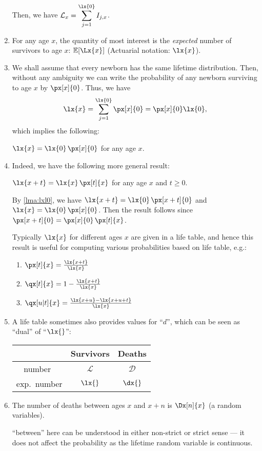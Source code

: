 \begin{enumerate}
Then, we have \(\displaystyle\mathcal{L}_{x}=\sum_{j=1}^{\lx{0}}I_{j,x}\).
\item For any age \(x\), the quantity of most interest is the \emph{expected}
number of survivors to age \(x\): \(\expv{\Lx{x}}\) (Actuarial notation:
\(\lx{x}\)).
\item We shall assume that every newborn has the same lifetime distribution.
Then, without any ambiguity we can write the probability of any newborn
surviving to age \(x\) by \(\px[x]{0}\). Thus, we have
\[
\lx{x}=\sum_{j=1}^{\lx{0}}\px[x]{0}=\px[x]{0}\lx{0},
\]
which implies the following:
\begin{lemma}
\label{lma:lxl0}
\(\lx{x}=\lx{0}\,\px[x]{0}\) for any age \(x\).
\end{lemma}

\item Indeed, we have the following more general result:
\begin{proposition}
\label{prp:lxpx}
\(\lx{x+t}=\lx{x}\,\px[t]{x}\) for any age \(x\) and \(t\ge 0\).
\end{proposition}
\begin{pf}
By \cref{lma:lxl0}, we have \(\lx{x+t}=\lx{0}\,\px[x+t]{0}\) and
\(\lx{x}=\lx{0}\,\px[x]{0}\). Then the result follows since
\(\px[x+t]{0}=\px[x]{0}\,\px[t]{x}\).
\end{pf}

Typically \(\lx{x}\) for different ages \(x\) are given in a life table, and
hence this result is useful for computing various probabilities based on life
table, e.g.:
\begin{enumerate}
\item \(\px[t]{x}=\frac{\lx{x+t}}{\lx{x}}\)
\item \(\qx[t]{x}=1-\frac{\lx{x+t}}{\lx{x}}\)
\item \(\qx[u|t]{x}=\frac{\lx{x+u}-\lx{x+u+t}}{\lx{x}}\)
\end{enumerate}

\item A life table sometimes also provides values for ``\(d\)'', which can be
seen as ``dual'' of ``\(\lx{}\)'':
\begin{center}
\begin{tabular}{ccc}
\toprule
&Survivors&Deaths\\
\midrule
number\ &\(\mathcal{L}\)&\(\mathcal{D}\)\\
exp.\ number &\(\lx{}\)&\(\dx{}\)\\
\bottomrule
\end{tabular}
\end{center}
\item The number of deaths between ages \(x\) and \(x+n\) is
\(\Dx[n]{x}\) (a random variables).
\begin{note}
``between'' here can be understood in either non-strict or strict sense --- it
does not affect the probability as the lifetime random variable is continuous.
\end{note}


\end{enumerate}
